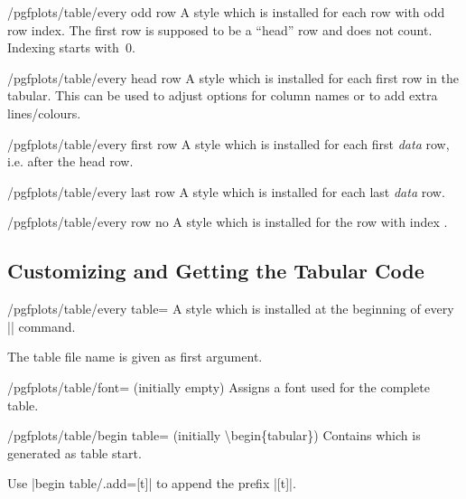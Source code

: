 \begin{stylekey}{/pgfplots/table/every odd row}	
	A style which is installed for each row with odd row index. The first row is supposed to be a ``head'' row and does not count. Indexing starts with~$0$.
\end{stylekey}

\begin{stylekey}{/pgfplots/table/every head row}	
	A style which is installed for each first row in the tabular. This can be used to adjust options for column names or to add extra lines/colours.
\end{stylekey}

\begin{stylekey}{/pgfplots/table/every first row}	
	A style which is installed for each first \emph{data} row, i.e. after the head row.
\end{stylekey}

\begin{stylekey}{/pgfplots/table/every last row}	
	A style which is installed for each last \emph{data} row.
\end{stylekey}

\begin{stylekey}{/pgfplots/table/every row no }	
	A style which is installed for the row with index .
\end{stylekey}

\subsection{Customizing and Getting the Tabular Code}
\begin{stylekey}{/pgfplots/table/every table=}
	A style which is installed at the beginning of every |\pgfplotstabletypeset| command.

	The table file name is given as first argument.
\end{stylekey}

\begin{key}{/pgfplots/table/font= (initially empty)}
	Assigns a font used for the complete table.
\end{key}

\begin{key}{/pgfplots/table/begin table= (initially \textbackslash begin\{tabular\})}
	Contains  which is generated as table start.

	Use |begin table/.add={}{[t]}| to append the prefix |[t]|.
\end{key}

